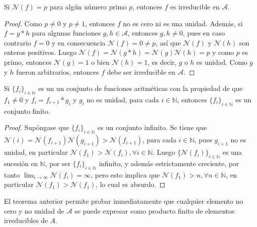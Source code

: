 \begin{proposition}
Si $\mathcal{N}(f)=p$ para algún número primo $p$, entonces $f$ es irreducible en $\mathcal{A}$.
\end{proposition}
\begin{proof}
Como $p \ne 0$ y $p \ne 1$, entonces $f$ no es cero ni es una unidad. Además, si $f=g*h$ para algunas funciones $g,h \in \mathcal{A}$, entonces  $g,h \ne 0$,  pues en caso contrario $f=0$ y en consecuencia $\mathcal{N}(f)=0 \ne p$, así que $\mathcal{N}(f)$ y $\mathcal{N}(h)$ son enteros positivos. Luego $\mathcal{N}(f)=\mathcal{N}(g*h)=\mathcal{N}(g)\mathcal{N}(h)=p$ y como $p$ es primo, entonces $\mathcal{N}(g)=1$ o bien $\mathcal{N}(h)=1$, es decir, $g$ o $h$ es unidad. Como $g$ y $h$ fueron arbitrarios, entonces $f$ debe ser irreducible en $\mathcal{A}$.
\end{proof}

\begin{theorem} \label{thm:chain1}
Si $\{ f_i \}_{i \in \mathbb{N}}$ es un un conjunto de funciones aritméticas con la propiedad de que $f_1 \ne 0$ y $f_i=f_{i+1}*g_i$ y $g_i$ no es unidad, para cada $i \in \mathbb{N}$, entonces $\{ f_i \}_{i \in \mathbb{N}}$ es un conjunto finito.
\end{theorem}
\begin{proof}
Supóngase que $\{ f_i \}_{i \in \mathbb{N}}$ es un conjunto infinito. Se tiene que $\mathcal{N}(i)=\mathcal{N}(f_{i+1})\mathcal{N}(g_{i+1})>\mathcal{N}(f_{i+1})$, para cada $i \in \mathbb{N}$, pues $g_{i+1}$ no es unidad, en particular $\mathcal{N}(f_1)>\mathcal{N}(f_i), \forall i \in \mathbb{N}$. Luego $\{ \mathcal{N}(f_i) \}_{i \in \mathbb{N}}$ es una sucesión en $\mathbb{N}$, por ser $\{ f_i \}_{i \in \mathbb{N}}$ infinito, y además estrictamente creciente, por tanto $\lim_{i \to \infty} \mathcal{N}(f_i)=\infty$, pero esto implica que $\mathcal{N}(f_1)>n, \forall n \in \mathbb{N}$, en particular $\mathcal{N}(f_1)>\mathcal{N}(f_1)$, lo cual es absurdo.
\end{proof}

El teorema anterior permite probar inmediatamente que cualquier elemento no cero y no unidad de $\mathcal{A}$ se puede expresar como producto finito de elementos irreducibles de $A$.

